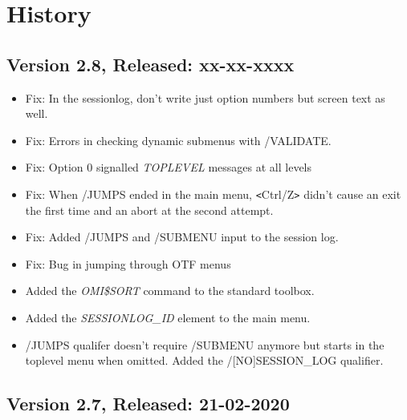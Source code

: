 \documentclass[a4paper]{book}
\newcommand{\lt}{\texttt{<}}
\newcommand{\gt}{\texttt{>}}
\begin{document}
\chapter{History}

\section*{Version 2.8, Released: xx-xx-xxxx}

\begin{itemize}
\item Fix: In the sessionlog, don't write just option numbers but screen text as well.
\item Fix: Errors in checking dynamic submenus with \textsf{/VALIDATE}.
\item Fix: Option \textsf{0} signalled \textsl{TOPLEVEL} messages at all levels
\item Fix: When \textsf{/JUMPS} ended in the main menu, \lt Ctrl/Z\gt{} didn't cause an exit the first time and an abort at the second attempt.
\item Fix: Added \textsf{/JUMPS} and \textsf{/SUBMENU} input to the session log.
\item Fix: Bug in jumping through OTF menus
\item Added the \textsl{OMI{\$}SORT} command to the standard toolbox.
\item Added the \textsl{SESSIONLOG{\_}ID} element to the main menu.
\item \textsf{/JUMPS} qualifer doesn't require \textsf{/SUBMENU} anymore but starts in the toplevel menu when omitted.
\teim Added the /\textsf{[NO]SESSION{\_}LOG} qualifier.
\end{itemize}

\section*{Version 2.7, Released: 21-02-2020}
\end{document}
